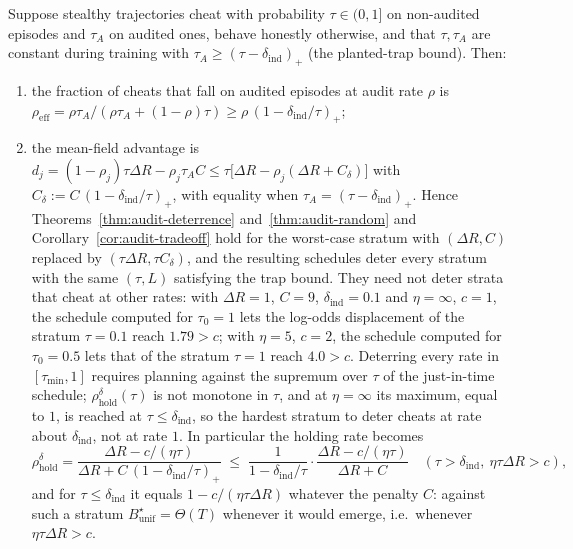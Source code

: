 \begin{proposition}
\label{prop:audit-indist}
Suppose stealthy trajectories cheat with probability $\tau\in(0,1]$ on
non-audited episodes and $\tau_A$ on audited ones, behave honestly otherwise,
and that $\tau,\tau_A$ are constant during training with
$\tau_A\ge(\tau-\delta_{\mathrm{ind}})_+$ (the planted-trap bound). Then:
\begin{enumerate}
\item[\textup{(a)}] the fraction of cheats that fall on audited episodes at
audit rate $\rho$ is
$\rho_{\mathrm{eff}}=\rho\tau_A/(\rho\tau_A+(1-\rho)\tau)\ge\rho\,(1-\delta_{\mathrm{ind}}/\tau)_+$;
\item[\textup{(b)}] the mean-field advantage is
$d_j=(1-\rho_j)\tau\Delta R-\rho_j\tau_AC\le\tau\bigl[\Delta R-\rho_j(\Delta R+C_\delta)\bigr]$
with $C_\delta:=C\,(1-\delta_{\mathrm{ind}}/\tau)_+$, with equality when
$\tau_A=(\tau-\delta_{\mathrm{ind}})_+$. Hence
Theorems~\ref{thm:audit-deterrence} and~\ref{thm:audit-random} and
Corollary~\ref{cor:audit-tradeoff} hold for the worst-case stratum with
$(\Delta R,C)$ replaced by $(\tau\Delta R,\tau C_\delta)$, and the resulting
schedules deter every stratum with the same $(\tau,L)$ satisfying the trap bound. They need not deter strata that cheat at other rates: with $\Delta R=1$, $C=9$, $\delta_{\mathrm{ind}}=0.1$ and $\eta=\infty$, $c=1$, the schedule computed for $\tau_0=1$ lets the log-odds displacement of the stratum $\tau=0.1$ reach $1.79>c$; with $\eta=5$, $c=2$, the schedule computed for $\tau_0=0.5$ lets that of the stratum $\tau=1$ reach $4.0>c$. Deterring every rate in $[\tau_{\min},1]$ requires planning against the supremum over $\tau$ of the just-in-time schedule; $\rho^{\delta}_{\mathrm{hold}}(\tau)$ is not monotone in $\tau$, and at $\eta=\infty$ its maximum, equal to $1$, is reached at $\tau\le\delta_{\mathrm{ind}}$, so the hardest stratum to deter cheats at rate about $\delta_{\mathrm{ind}}$, not at rate $1$. In particular the
holding rate becomes
\[
  \rho^{\delta}_{\mathrm{hold}}=\frac{\Delta R-c/(\eta\tau)}{\Delta R+C\,(1-\delta_{\mathrm{ind}}/\tau)_+}
  \;\le\;\frac{1}{1-\delta_{\mathrm{ind}}/\tau}\cdot\frac{\Delta R-c/(\eta\tau)}{\Delta R+C}
  \quad(\tau>\delta_{\mathrm{ind}},\ \eta\tau\Delta R>c),
\]
and for $\tau\le\delta_{\mathrm{ind}}$ it equals $1-c/(\eta\tau\Delta R)$
whatever the penalty $C$: against such a stratum $B^\star_{\mathrm{unif}}=\Theta(T)$
whenever it would emerge, i.e.\ whenever $\eta\tau\Delta R>c$.
\end{enumerate}
\end{proposition}
